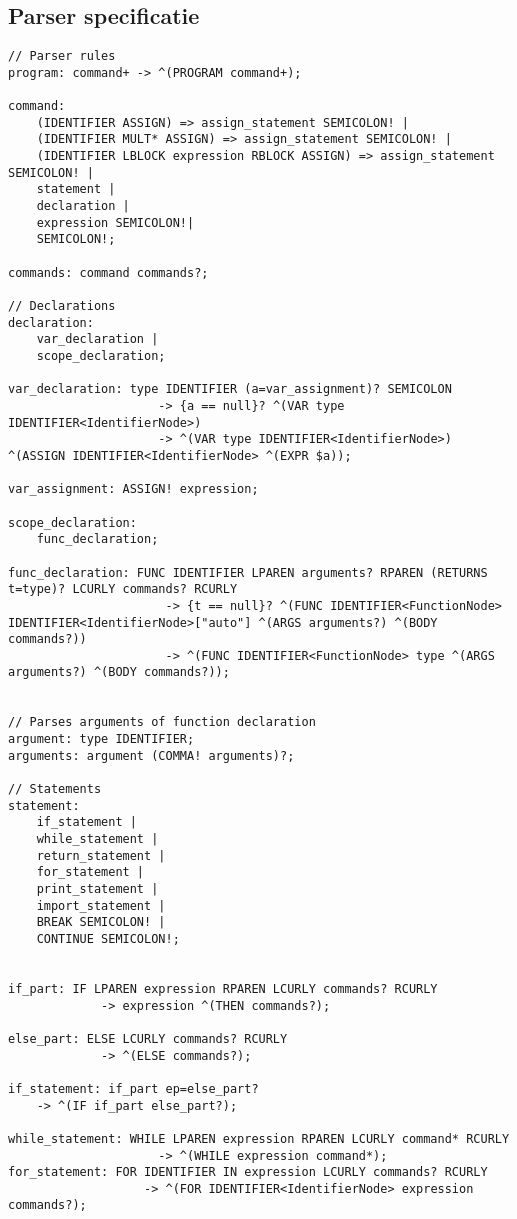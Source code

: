 \clearpage
\begin{landscape}
\section{Parser specificatie} %
\label{sec:parser_specificatie}
\begin{lstlisting}
// Parser rules
program: command+ -> ^(PROGRAM command+);

command:
    (IDENTIFIER ASSIGN) => assign_statement SEMICOLON! |
    (IDENTIFIER MULT* ASSIGN) => assign_statement SEMICOLON! |
    (IDENTIFIER LBLOCK expression RBLOCK ASSIGN) => assign_statement SEMICOLON! |
    statement |
    declaration |
    expression SEMICOLON!|
    SEMICOLON!;

commands: command commands?;

// Declarations
declaration:
    var_declaration |
    scope_declaration;

var_declaration: type IDENTIFIER (a=var_assignment)? SEMICOLON
                     -> {a == null}? ^(VAR type IDENTIFIER<IdentifierNode>)
                     -> ^(VAR type IDENTIFIER<IdentifierNode>) ^(ASSIGN IDENTIFIER<IdentifierNode> ^(EXPR $a));

var_assignment: ASSIGN! expression;

scope_declaration: 
    func_declaration;

func_declaration: FUNC IDENTIFIER LPAREN arguments? RPAREN (RETURNS t=type)? LCURLY commands? RCURLY
                      -> {t == null}? ^(FUNC IDENTIFIER<FunctionNode> IDENTIFIER<IdentifierNode>["auto"] ^(ARGS arguments?) ^(BODY commands?))
                      -> ^(FUNC IDENTIFIER<FunctionNode> type ^(ARGS arguments?) ^(BODY commands?));


// Parses arguments of function declaration
argument: type IDENTIFIER;
arguments: argument (COMMA! arguments)?;

// Statements
statement:
    if_statement | 
    while_statement |
    return_statement |
    for_statement |
    print_statement |
    import_statement |
    BREAK SEMICOLON! |
    CONTINUE SEMICOLON!;


if_part: IF LPAREN expression RPAREN LCURLY commands? RCURLY
             -> expression ^(THEN commands?);

else_part: ELSE LCURLY commands? RCURLY
             -> ^(ELSE commands?);

if_statement: if_part ep=else_part?
    -> ^(IF if_part else_part?);

while_statement: WHILE LPAREN expression RPAREN LCURLY command* RCURLY
                     -> ^(WHILE expression command*);
for_statement: FOR IDENTIFIER IN expression LCURLY commands? RCURLY
                   -> ^(FOR IDENTIFIER<IdentifierNode> expression commands?);


\end{lstlisting}
\end{landscape}
